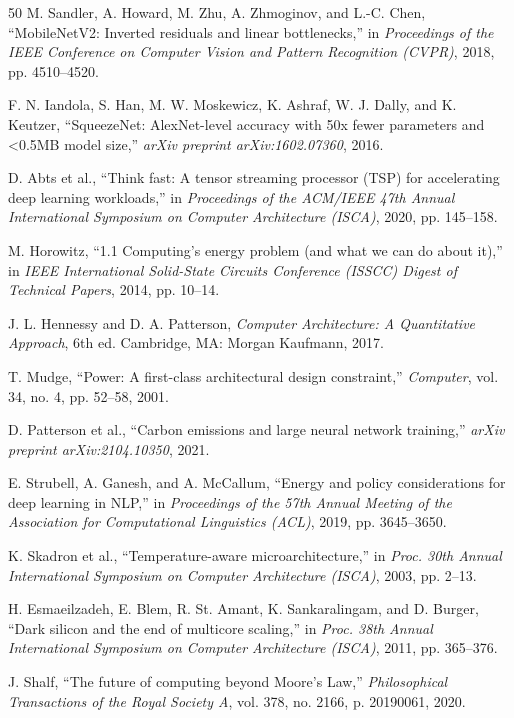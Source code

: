 \documentclass[conference]{IEEEtran}
\begin{document}
\begin{thebibliography}{50}
 M. Sandler, A. Howard, M. Zhu, A. Zhmoginov, and L.-C. Chen, ``MobileNetV2: Inverted residuals and linear bottlenecks,'' in \textit{Proceedings of the IEEE Conference on Computer Vision and Pattern Recognition (CVPR)}, 2018, pp. 4510--4520.

 F. N. Iandola, S. Han, M. W. Moskewicz, K. Ashraf, W. J. Dally, and K. Keutzer, ``SqueezeNet: AlexNet-level accuracy with 50x fewer parameters and <0.5MB model size,'' \textit{arXiv preprint arXiv:1602.07360}, 2016.

 D. Abts et al., ``Think fast: A tensor streaming processor (TSP) for accelerating deep learning workloads,'' in \textit{Proceedings of the ACM/IEEE 47th Annual International Symposium on Computer Architecture (ISCA)}, 2020, pp. 145--158.

 M. Horowitz, ``1.1 Computing's energy problem (and what we can do about it),'' in \textit{IEEE International Solid-State Circuits Conference (ISSCC) Digest of Technical Papers}, 2014, pp. 10--14.

 J. L. Hennessy and D. A. Patterson, \textit{Computer Architecture: A Quantitative Approach}, 6th ed. Cambridge, MA: Morgan Kaufmann, 2017.

 T. Mudge, ``Power: A first-class architectural design constraint,'' \textit{Computer}, vol. 34, no. 4, pp. 52--58, 2001.

 D. Patterson et al., ``Carbon emissions and large neural network training,'' \textit{arXiv preprint arXiv:2104.10350}, 2021.

 E. Strubell, A. Ganesh, and A. McCallum, ``Energy and policy considerations for deep learning in NLP,'' in \textit{Proceedings of the 57th Annual Meeting of the Association for Computational Linguistics (ACL)}, 2019, pp. 3645--3650.

 K. Skadron et al., ``Temperature-aware microarchitecture,'' in \textit{Proc. 30th Annual International Symposium on Computer Architecture (ISCA)}, 2003, pp. 2--13.


 H. Esmaeilzadeh, E. Blem, R. St. Amant, K. Sankaralingam, and D. Burger, ``Dark silicon and the end of multicore scaling,'' in \textit{Proc. 38th Annual International Symposium on Computer Architecture (ISCA)}, 2011, pp. 365--376.

 J. Shalf, ``The future of computing beyond Moore's Law,'' \textit{Philosophical Transactions of the Royal Society A}, vol. 378, no. 2166, p. 20190061, 2020.


\end{thebibliography}
\end{document}
